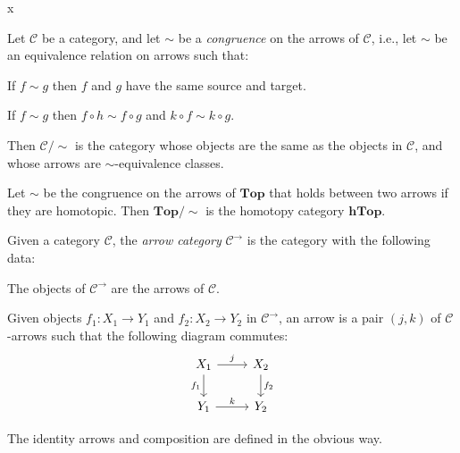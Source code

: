 \documentclass[article, a4paper, 11pt, oneside]{memoir}
\numberwithin{equation}{chapter}
\newcommand{\cat}[1]{\mathcal{#1}}
\newcommand{\ncat}[1]{\mathbf{#1}} %
\newcommand{\catTop}{\ncat{Top}}
\newcommand{\cathTop}{\ncat{hTop}}
\newcommand{\catC}{\cat{C}}
\begin{document}
\begin{definition}
    x
\end{definition}


\begin{definition}
    Let $\catC$ be a category, and let $\sim$ be a \emph{congruence} on the arrows of $\catC$, i.e., let $\sim$ be an equivalence relation on arrows such that:
    \begin{enumdef}
        \item If $f \sim g$ then $f$ and $g$ have the same source and target.
        
        \item If $f \sim g$ then $f \circ h \sim f \circ g$ and $k \circ f \sim k \circ g$.
    \end{enumdef}
    Then $\catC/{\sim}$ is the category whose objects are the same as the objects in $\catC$, and whose arrows are $\sim$-equivalence classes.
\end{definition}


\begin{example}
    Let $\sim$ be the congruence on the arrows of $\catTop$ that holds between two arrows if they are homotopic. Then $\catTop/{\sim}$ is the homotopy category $\cathTop$.
\end{example}


\begin{definition}
    Given a category $\catC$, the \emph{arrow category} $\catC^\to$ is the category with the following data:
    \begin{enumdef}
        \item The objects of $\catC^\to$ are the arrows of $\catC$.
        
        \item Given objects $f_1 \colon X_1 \to Y_1$ and $f_2 \colon X_2 \to Y_2$ in $\catC^\to$, an arrow is a pair $(j,k)$ of $\catC$-arrows such that the following diagram commutes:
        \begin{equation*}
            \begin{tikzcd}
                X_1
                    \ar[r, "j"]
                    \ar[d, "f_1", swap]
                & X_2
                    \ar[d, "f_2"]
                \\
                Y_1
                    \ar[r, "k"]
                & Y_2
            \end{tikzcd}
        \end{equation*}
    \end{enumdef}
    The identity arrows and composition are defined in the obvious way.
\end{definition}
\end{document}
